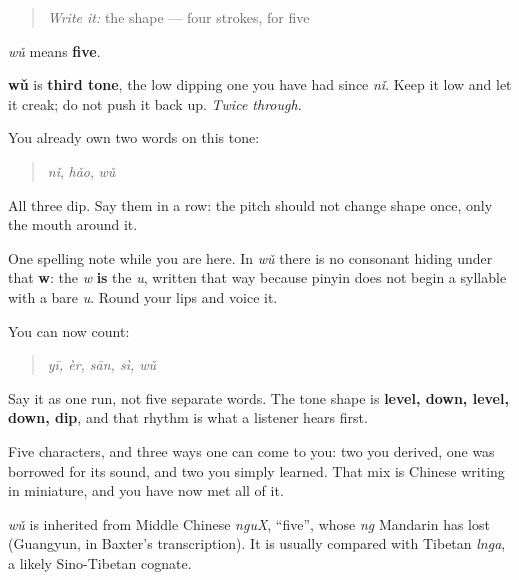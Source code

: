\label{lesson:ZH-C03-wu}



\begin{quote}
\emph{Write it:} the shape — four strokes, for five
\end{quote}

\begin{sounds}
\textbf{} \emph{wǔ} means \textbf{five}.

\textbf{wǔ} is \textbf{third tone}, the low dipping one you have had since \emph{nǐ}. Keep it low and let it creak; do not push it back up. \emph{Twice through.}

You already own two words on this tone:

\begin{quote}
 \emph{nǐ},  \emph{hǎo},  \emph{wǔ}
\end{quote}

All three dip. Say them in a row: the pitch should not change shape once, only the mouth around it.

One spelling note while you are here. In \emph{wǔ} there is no consonant hiding under that \textbf{w}: the \emph{w} \textbf{is} the \emph{u}, written that way because pinyin does not begin a syllable with a bare \emph{u}. Round your lips and voice it.
\end{sounds}

\begin{grammarlens}[title={What you've built — one to five}]
You can now count:

\begin{quote}
    
\end{quote}

\begin{quote}
\emph{yī, èr, sān, sì, wǔ}
\end{quote}

Say it as one run, not five separate words. The tone shape is \textbf{level, down, level, down, dip}, and that rhythm is what a listener hears first.

Five characters, and three ways one can come to you: two you derived, one was borrowed for its sound, and two you simply learned. That mix is Chinese writing in miniature, and you have now met all of it.
\end{grammarlens}

\begin{cousinweb}
\textbf{} \emph{wǔ} is inherited from Middle Chinese \emph{nguX}, \textquotedblleft{}five\textquotedblright{}, whose \emph{ng} Mandarin has lost (Guangyun, in Baxter's transcription). It is usually compared with Tibetan \emph{lnga}, a likely Sino-Tibetan cognate.
\end{cousinweb}


